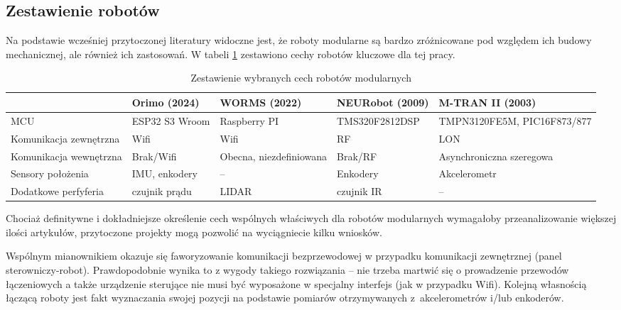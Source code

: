 \subsection{Zestawienie robotów}
Na podstawie wcześniej przytoczonej literatury widoczne jest, że roboty modularne są bardzo zróżnicowane pod względem ich budowy mechanicznej, ale również ich zastosowań. W tabeli \ref{tab: comp_robots} zestawiono cechy robotów kluczowe dla tej pracy.
\begin{table}[!ht]
    \centering
    \begin{tabular}{p{2cm} ||p{2.5cm}|p{2.5cm}|p{3cm}|p{3cm}}
             & Orimo (2024) & WORMS (2022) & NEURobot (2009) & M-TRAN II (2003) \\ \hline \hline
            MCU & ESP32 S3 Wroom & Raspberry PI & TMS320F2812DSP & TMPN3120FE5M, PIC16F873/877 \\ \hline
            Komunikacja zewnętrzna & Wifi & Wifi & RF & LON \\ \hline
            Komunikacja wewnętrzna & Brak/Wifi & Obecna, niezdefiniowana & Brak/RF & Asynchroniczna szeregowa \\ \hline
            Sensory położenia & IMU, enkodery & --  & Enkodery & Akcelerometr \\ \hline
            Dodatkowe perfyferia & czujnik prądu & LIDAR & czujnik IR & -- \\ \hline
        \end{tabular}
    \caption{Zestawienie wybranych cech robotów modularnych}
    \label{tab: comp_robots}
\end{table}

Chociaż definitywne i dokładniejsze określenie cech wspólnych właściwych dla robotów modularnych wymagałoby przeanalizowanie większej ilości artykułów, przytoczone projekty mogą pozwolić na wyciągniecie kilku wniosków. 

Wspólnym mianownikiem okazuje się faworyzowanie komunikacji bezprzewodowej w przypadku komunikacji zewnętrznej (panel sterowniczy-robot). Prawdopodobnie wynika to z wygody takiego rozwiązania -- nie trzeba martwić się o prowadzenie przewodów łączeniowych a także urządzenie sterujące nie musi być wyposażone w specjalny interfejs (jak w przypadku Wifi). Kolejną własnością łączącą roboty jest fakt wyznaczania swojej pozycji na podstawie pomiarów otrzymywanych z~akcelerometrów i/lub enkoderów.

